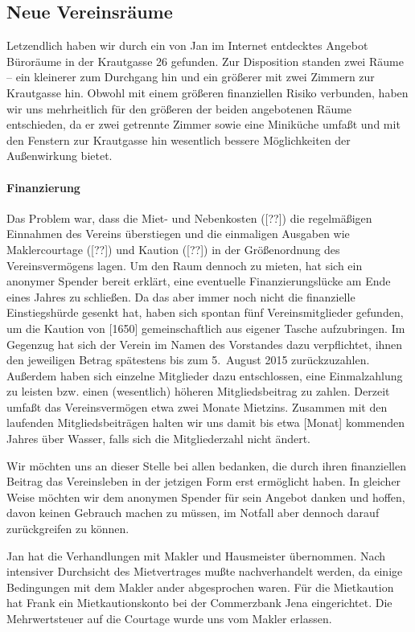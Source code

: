 \documentclass[10pt,DIV16]{scrartcl}
\begin{document}
\subsection{Neue Vereinsräume}

Letzendlich haben wir durch ein von Jan im Internet entdecktes Angebot
Büroräume in der Krautgasse 26 gefunden.  Zur Disposition standen zwei Räume
-- ein kleinerer zum Durchgang hin und ein größerer mit zwei Zimmern zur
Krautgasse hin.  Obwohl mit einem größeren finanziellen Risiko verbunden,
haben wir uns mehrheitlich für den größeren der beiden angebotenen Räume
entschieden, da er zwei getrennte Zimmer sowie eine Miniküche umfaßt und mit
den Fenstern zur Krautgasse hin wesentlich bessere Möglichkeiten der
Außenwirkung bietet.

\paragraph{Finanzierung}

Das Problem war, dass die Miet- und Nebenkosten ([??\EUR]) die regelmäßigen
Einnahmen des Vereins überstiegen und die einmaligen Ausgaben wie
Maklercourtage ([??\EUR]) und Kaution ([??\EUR]) in der Größenordnung des
Vereinsvermögens lagen.  Um den Raum dennoch zu mieten, hat sich ein anonymer
Spender bereit erklärt, eine eventuelle Finanzierungslücke am Ende eines
Jahres zu schließen.  Da das aber immer noch nicht die finanzielle
Einstiegshürde gesenkt hat, haben sich spontan fünf Vereinsmitglieder
gefunden, um die Kaution von [1650\EUR] gemeinschaftlich aus eigener Tasche
aufzubringen.  Im Gegenzug hat sich der Verein im Namen des Vorstandes dazu
verpflichtet, ihnen den jeweiligen Betrag spätestens bis zum 5.\ August 2015
zurückzuzahlen.  Außerdem haben sich einzelne Mitglieder dazu entschlossen,
eine Einmalzahlung zu leisten bzw. einen (wesentlich) höheren Mitgliedsbeitrag
zu zahlen.  Derzeit umfaßt das Vereinsvermögen etwa zwei Monate Mietzins.
Zusammen mit den laufenden Mitgliedsbeiträgen halten wir uns damit bis etwa
[Monat] kommenden Jahres über Wasser, falls sich die Mitgliederzahl nicht
ändert.

Wir möchten uns an dieser Stelle bei allen bedanken, die durch ihren
finanziellen Beitrag das Vereinsleben in der jetzigen Form erst ermöglicht
haben.  In gleicher Weise möchten wir dem anonymen Spender für sein Angebot
danken und hoffen, davon keinen Gebrauch machen zu müssen, im Notfall aber
dennoch darauf zurückgreifen zu können.

Jan hat die Verhandlungen mit Makler und Hausmeister übernommen.  Nach
intensiver Durchsicht des Mietvertrages mußte nachverhandelt werden, da einige
Bedingungen mit dem Makler ander abgesprochen waren.  Für die Mietkaution hat
Frank ein Mietkautionskonto bei der Commerzbank Jena eingerichtet.  Die
Mehrwertsteuer auf die Courtage wurde uns vom Makler erlassen.
\end{document}
